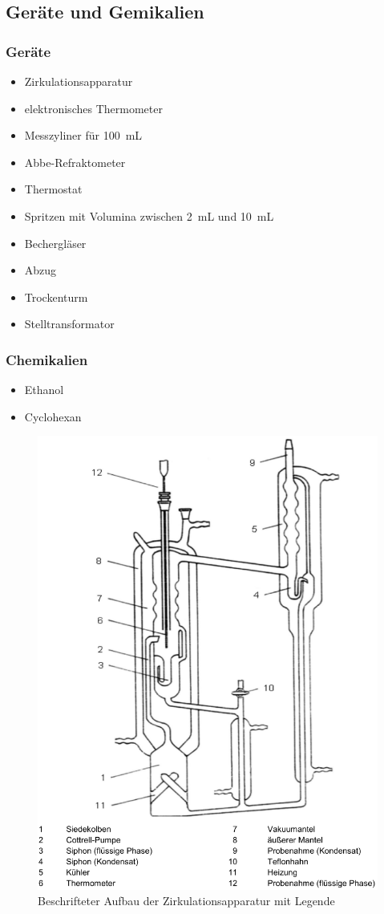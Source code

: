 \subsection*{Geräte und Gemikalien}

\subsubsection*{Geräte}
\begin{itemize}
	\item Zirkulationsapparatur
	\item elektronisches Thermometer
	\item Messzyliner für \SI{100}{\milli\liter}
	\item Abbe-Refraktometer
	\item Thermostat
	\item Spritzen mit Volumina zwischen \SI{2}{\milli\liter} und \SI{10}{\milli\liter}
	\item Bechergläser
	\item Abzug
	\item Trockenturm
	\item Stelltransformator
\end{itemize}
\subsubsection*{Chemikalien}
\begin{itemize}
	\item Ethanol
	\item Cyclohexan
\end{itemize}
\begin{figure}[h!]
	\centering
	\includegraphics[width=0.7\linewidth]{img/zirkulationsapparatur}
	\caption{Beschrifteter Aufbau der Zirkulationsapparatur mit Legende}
	\label{fig:zirkulationsapparatur}
\end{figure}